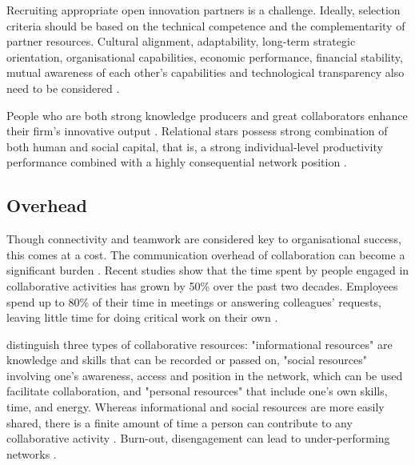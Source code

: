 



Recruiting appropriate open innovation partners is a challenge. Ideally, selection criteria should be based on the technical competence and the complementarity of partner resources. Cultural alignment, adaptability, long-term strategic orientation, organisational capabilities, economic performance, financial stability, mutual awareness of each other's capabilities and technological transparency also need to be considered \citep{aloini2016structured}.\medskip

People who are both strong knowledge producers and great collaborators enhance their firm’s innovative output \citep{grigoriou2014structural}. Relational stars possess strong combination of both human and social capital, that is, a strong individual-level productivity performance combined with a highly consequential network position \citep{grigoriou2014structural}.\medskip

\subsection{Overhead}

Though connectivity and teamwork are considered key to organisational success, this comes at a cost. The communication overhead of collaboration can become a significant burden \citep{cross2013has}. Recent studies show that the time spent by people engaged in collaborative activities has grown by 50\% over the past two decades. Employees spend up to 80\% of their time in meetings or answering colleagues’ requests, leaving little time for doing critical work on their own \citep{cross2013has,cross2015investing,cross2016collaborative}. 

\citet{cross2016collaborative} distinguish three types of collaborative resources: "informational resources" are knowledge and skills that can be recorded or passed on, "social resources" involving one's awareness, access and position in the network, which can be used facilitate collaboration, and "personal resources" that include one's own skills, time, and energy. Whereas informational and social resources are more easily shared, there is a finite amount of time a person can contribute to any collaborative activity \citep{cross2016collaborative}. Burn-out, disengagement can lead to under-performing networks \citep{cross2013has}.

